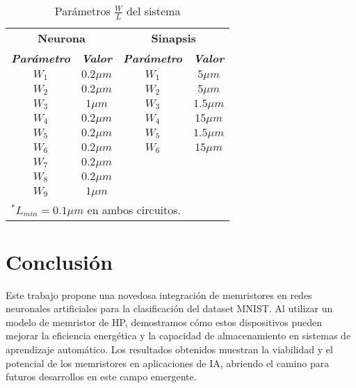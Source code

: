 \documentclass[conference]{IEEEtran}
\begin{document}
\begin{table}[htbp]
\caption{Parámetros $\frac{W}{L}$ del sistema}
\begin{center}
\begin{tabular}{|c|c|c|c|}
\hline
\multicolumn{2}{|c|}{\textbf{Neurona}}&\multicolumn{2}{|c|}{\textbf{Sinapsis}} \\
\cline{1-4} 
\textbf{\textit{Parámetro}} & \textbf{\textit{Valor}}& \textbf{\textit{Parámetro}}& \textbf{\textit{Valor}} \\
\hline
$W_{1}$ & $0.2\mu m$ & $W_{1}$ & $5\mu m$\\
\hline
$W_{2}$ & $0.2\mu m$ & $W_{2}$ & $5\mu m$\\
\hline
$W_{3}$ & $1\mu m$ & $W_{3}$ & $1.5\mu m$\\
\hline
$W_{4}$ & $0.2\mu m$ & $W_{4}$ & $15\mu m$\\
\hline
$W_{5}$ & $0.2\mu m$ & $W_{5}$ & $1.5\mu m$\\
\hline
$W_{6}$ & $0.2\mu m$ & $W_{6}$ & $15\mu m$\\
\hline
$W_{7}$ & $0.2\mu m$ & & \\
\hline
$W_{8}$ & $0.2\mu m$ & & \\
\hline
$W_{9}$ & $1\mu m$ & & \\
\hline
\multicolumn{4}{l}{$^{*}$$L_{min}=0.1\mu m$ en ambos circuitos.}
\end{tabular}
\label{parametros}
\end{center}
\end{table}

\section*{Conclusión}

Este trabajo propone una novedosa integración de memristores en redes neuronales artificiales para la clasificación del dataset MNIST. Al utilizar un modelo de memristor de HP, demostramos cómo estos dispositivos pueden mejorar la eficiencia energética y la capacidad de almacenamiento en sistemas de aprendizaje automático. Los resultados obtenidos muestran la viabilidad y el potencial de los memristores en aplicaciones de IA, abriendo el camino para futuros desarrollos en este campo emergente.



\end{document}
